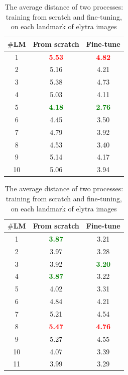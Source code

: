 \documentclass[review]{elsarticle}
\begin{document}
\begin{table}[h]
	\begin{minipage}[t]{0.45\textwidth}
		\centering
		\begin{tabular}{|c|c|c|}
		\hline
		\textbf{$\#$LM} & \textbf{From scratch} & \textbf{Fine-tune} \\ \hline
		1 & \textcolor{red}{\textbf{5.53}} & \textcolor{red}{\textbf{4.82}}\\ \hline
		2 & 5.16 & 4.21 \\ \hline
		3 & 5.38  & 4.73 \\ \hline
		4 & 5.03  & 4.11 \\ \hline
		5 & \textcolor{green}{\textbf{4.18}}  & \textcolor{green}{\textbf{2.76}}\\ \hline
		6 & 4.45  & 3.50 \\ \hline
		7 & 4.79  & 3.92 \\ \hline
		8 & 4.53  & 3.40\\ \hline
		9 & 5.14  & 4.17 \\ \hline
		10 & 5.06  & 3.94\\ \hline
	\end{tabular}
	\caption{The average distance of two processes: training from scratch and fine-tuning, on each landmark of head images}
	\label{cmptete}
	\end{minipage}
	\hfill
	\begin{minipage}[t]{0.45\textwidth}
		\centering
		\begin{tabular}{|c|c|c|}
			\hline
			\textbf{$\#$LM} & \textbf{From scratch} & \textbf{Fine-tune} \\ \hline
			1 & \textcolor{green}{\textbf{3.87}} & 3.21  \\ \hline
			2 & 3.97 & 3.28 \\ \hline
			3 & 3.92  & \textcolor{green}{\textbf{3.20}}\\ \hline
			4 & \textcolor{green}{\textbf{3.87}}  & 3.22 \\ \hline
			5 & 4.02  & 3.31 \\ \hline
			6 & 4.84  & 4.21\\ \hline
			7 & 5.21  & 4.54 \\ \hline
			8 & \textcolor{red}{\textbf{5.47}}  & \textcolor{red}{\textbf{4.76}}\\ \hline
			9 & 5.27  & 4.55 \\ \hline
			10 & 4.07  & 3.39 \\ \hline
			11 & 3.99  & 3.29 \\ \hline
		\end{tabular}
		\caption{The average distance of two processes: training from scratch and fine-tuning, on each landmark of elytra images}
		\label{cmpelytre}
	\end{minipage}
\end{table}
\end{document}
